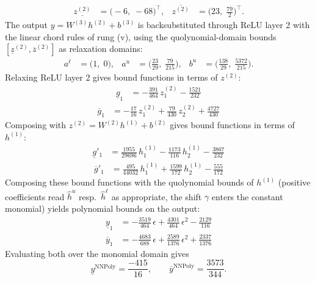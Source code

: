 \documentclass[11pt]{article}
\begin{document}
\begin{align*}
\underline{z^{(2)}} &= \bigl(-6,\; -68\bigr)^{\!\top}, & \overline{z^{(2)}} &= \bigl(23,\; \frac{79}{2}\bigr)^{\!\top}.
\end{align*}
The output $y = W^{(3)} h^{(2)} + b^{(3)}$ is backsubstituted through ReLU layer 2 with the linear chord rules of rung (v), using the quolynomial-domain bounds
$[\underline{z}^{(2)}, \overline{z}^{(2)}]$ as relaxation domains:
\begin{align*}
a^{\ell} &= \bigl(1,\; 0\bigr), & a^{u} &= \bigl(\frac{23}{29},\; \frac{79}{215}\bigr), & b^{u} &= \bigl(\frac{138}{29},\; \frac{5372}{215}\bigr).
\end{align*}
Relaxing ReLU layer 2 gives bound functions in terms of $z^{(2)}$:
\begin{align*}
\underline{g}_{1} &= -\frac{391}{464}\,z^{(2)}_{1} - \frac{1521}{232}
\end{align*}
\begin{align*}
\overline{g}_{1} &= -\frac{17}{16}\,z^{(2)}_{1} + \frac{79}{430}\,z^{(2)}_{2} + \frac{4727}{430}
\end{align*}
Composing with $z^{(2)} = W^{(2)} h^{(1)} + b^{(2)}$ gives bound functions in terms of $h^{(1)}$:
\begin{align*}
\underline{g}'_{1} &= \frac{1955}{29696}\,h^{(1)}_{1} - \frac{1173}{116}\,h^{(1)}_{2} - \frac{3867}{232}
\end{align*}
\begin{align*}
\overline{g}'_{1} &= \frac{495}{44032}\,h^{(1)}_{1} + \frac{1599}{172}\,h^{(1)}_{2} - \frac{555}{172}
\end{align*}
Composing these bound functions with the quolynomial bounds of $h^{(1)}$ (positive
coefficients read $\hat{h}^{u}$ resp.\ $\hat{h}^{\ell}$ as appropriate, the shift $\gamma$ enters the
constant monomial) yields polynomial bounds on the output:
\begin{align*}
\underline{y}_{1} &= -\frac{3519}{464}\,\epsilon + \frac{4301}{464}\,\epsilon^2 - \frac{2129}{116}
\end{align*}
\begin{align*}
\overline{y}_{1} &= -\frac{4683}{688}\,\epsilon + \frac{2589}{1376}\,\epsilon^2 + \frac{2337}{1376}
\end{align*}
Evaluating both over the monomial domain gives
\begin{equation*}
\underline{y}^{\text{NNPoly}} = \frac{-415}{16}, \qquad \overline{y}^{\text{NNPoly}} = \frac{3573}{344}.
\end{equation*}
\end{document}
